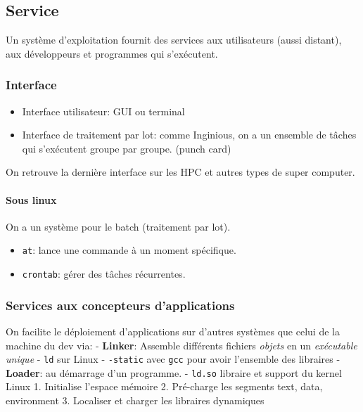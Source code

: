 \subsection{Service}\label{service}

Un système d'exploitation fournit des services aux utilisateurs (aussi
distant), aux développeurs et programmes qui s'exécutent.

\subsubsection{Interface}\label{interface}

\begin{itemize}
\tightlist
\item
  Interface utilisateur: GUI ou terminal
\item
  Interface de traitement par lot: comme Inginious, on a un ensemble de
  tâches qui s'exécutent groupe par groupe. (punch card)
\end{itemize}

On retrouve la dernière interface sur les HPC et autres types de super
computer.

\paragraph{Sous linux}\label{sous-linux}

On a un système pour le batch (traitement par lot).

\begin{itemize}
\tightlist
\item
  \texttt{at}: lance une commande à un moment spécifique.
\item
  \texttt{crontab}: gérer des tâches récurrentes.
\end{itemize}

\subsubsection{Services aux concepteurs
d'applications}\label{services-aux-concepteurs-dapplications}

On facilite le déploiement d'applications sur d'autres systèmes que
celui de la machine du dev via: - \textbf{Linker}: Assemble différents
fichiers \emph{objets} en un \emph{exécutable unique} - \texttt{ld} sur
Linux - \texttt{-static} avec \texttt{gcc} pour avoir l'ensemble des
libraires - \textbf{Loader}: au démarrage d'un programme. -
\texttt{ld.so} libraire et support du kernel Linux 1. Initialise
l'espace mémoire 2. Pré-charge les segments text, data, environment 3.
Localiser et charger les libraires dynamiques

